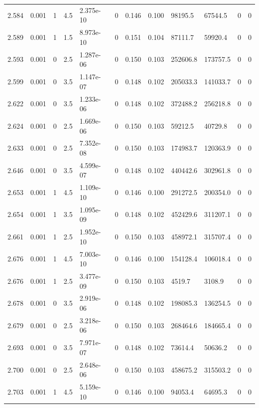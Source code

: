 \documentclass[preview]{standalone}
\begin{document}
{{{{{{\begin{tabular}{L{1.2cm}C{1.2cm} C{0.3cm}C{0.5cm} C{1.4cm}C{1.4cm} C{1.4cm}C{1.4cm} C{1.6cm}C{1.6cm} C{1.6cm}C{1.6cm}}
  2.584  &  0.001  & 1     & 4.5 &  2.375e-10  & 0  &  0.146&   0.100& 98195.5 & 67544.5   &  0 & 0  \\ 
  2.589  &  0.001  & 1     & 1.5 &  8.973e-10  & 0  &  0.151&   0.104& 87111.7 & 59920.4   &  0 & 0  \\ 
  2.593  &  0.001  & 0     & 2.5 &  1.287e-06  & 0  &  0.150&   0.103& 252606.8 & 173757.5   &  0 & 0  \\ 
  2.599  &  0.001  & 0     & 3.5 &  1.147e-07  & 0  &  0.148&   0.102& 205033.3 & 141033.7   &  0 & 0  \\ 
  2.622  &  0.001  & 0     & 3.5 &  1.233e-06  & 0  &  0.148&   0.102& 372488.2 & 256218.8   &  0 & 0  \\ 
  2.624  &  0.001  & 0     & 2.5 &  1.669e-06  & 0  &  0.150&   0.103& 59212.5 & 40729.8   &  0 & 0  \\ 
  2.633  &  0.001  & 0     & 2.5 &  7.352e-08  & 0  &  0.150&   0.103& 174983.7 & 120363.9   &  0 & 0  \\ 
  2.646  &  0.001  & 0     & 3.5 &  4.599e-07  & 0  &  0.148&   0.102& 440442.6 & 302961.8   &  0 & 0  \\ 
  2.653  &  0.001  & 1     & 4.5 &  1.109e-10  & 0  &  0.146&   0.100& 291272.5 & 200354.0   &  0 & 0  \\ 
  2.654  &  0.001  & 1     & 3.5 &  1.095e-09  & 0  &  0.148&   0.102& 452429.6 & 311207.1   &  0 & 0  \\ 
  2.661  &  0.001  & 1     & 2.5 &  1.952e-10  & 0  &  0.150&   0.103& 458972.1 & 315707.4   &  0 & 0  \\ 
  2.676  &  0.001  & 1     & 4.5 &  7.003e-10  & 0  &  0.146&   0.100& 154128.4 & 106018.4   &  0 & 0  \\ 
  2.676  &  0.001  & 1     & 2.5 &  3.477e-09  & 0  &  0.150&   0.103& 4519.7 & 3108.9   &  0 & 0  \\ 
  2.678  &  0.001  & 0     & 3.5 &  2.919e-06  & 0  &  0.148&   0.102& 198085.3 & 136254.5   &  0 & 0  \\ 
  2.679  &  0.001  & 0     & 2.5 &  3.218e-06  & 0  &  0.150&   0.103& 268464.6 & 184665.4   &  0 & 0  \\ 
  2.693  &  0.001  & 0     & 3.5 &  7.971e-07  & 0  &  0.148&   0.102& 73614.4 & 50636.2   &  0 & 0  \\ 
  2.700  &  0.001  & 0     & 2.5 &  2.648e-06  & 0  &  0.150&   0.103& 458675.2 & 315503.2   &  0 & 0  \\ 
  2.703  &  0.001  & 1     & 4.5 &  5.159e-10  & 0  &  0.146&   0.100& 94053.4 & 64695.3   &  0 & 0  \\ 

\end{tabular}}}}}}}
\end{document}
